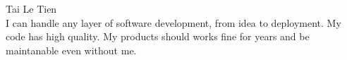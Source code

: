 {\Huge Tai Le Tien} \\
\vspace{8pt}
I can handle any layer of software development, from idea to deployment. My
code has high quality. My products should works fine for years and be
maintanable even without me.
